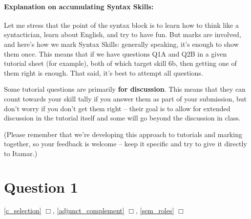 \documentclass{article}
\begin{document}
\pagestyle{empty}
\maketitle
\subtitle{Tutorial Week 6: Topics 4, 5 \& 6}

\paragraph{Explanation on accumulating Syntax Skills:} Let me stress that the point of the syntax block is to learn how to think like a syntactician, learn about English, and try to have fun. But marks are involved, and here's how we mark Syntax Skills: generally speaking, it's enough to show them once. This means that if we have questions Q1A and Q2B in a given tutorial sheet (for example), both of which target skill 6b, then getting one of them right is enough. That said, it's best to attempt all questions.

Some tutorial questions are primarily \textbf{for discussion}. This means that they can count towards your skill tally if you answer them as part of your submission, but don't worry if you don't get them right -- their goal is to allow for extended discussion in the tutorial itself and some will go beyond the discussion in class.

(Please remember that we're developing this approach to tutorials and marking together, so your feedback is welcome -- keep it specific and try to give it directly to Itamar.)

\section*{Question 1}
\hfill{} \ref{c_selection} $\Box$, \ref{adjunct_complement} $\Box$, \ref{sem_roles} $\Box$
\end{document}
